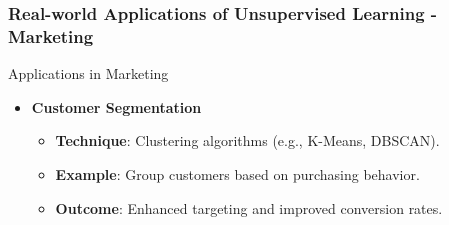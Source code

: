 \documentclass[aspectratio=169]{beamer}
\begin{document}
\begin{frame}[fragile]
  \frametitle{Real-world Applications of Unsupervised Learning - Marketing}
  \begin{block}{Applications in Marketing}
    \begin{itemize}
        \item \textbf{Customer Segmentation}
        \begin{itemize}
            \item \textbf{Technique}: Clustering algorithms (e.g., K-Means, DBSCAN).
            \item \textbf{Example}: Group customers based on purchasing behavior.
            \item \textbf{Outcome}: Enhanced targeting and improved conversion rates.
        \end{itemize}
    \end{itemize}
  \end{block}
\end{frame}
\end{document}
